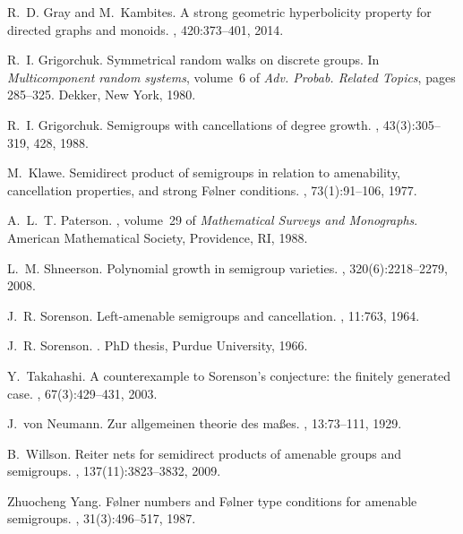 \documentclass[11pt,a4paper,reqno]{amsart}
\begin{document}
\begin{thebibliography}{10}
R.~D. Gray and M.~Kambites.
\newblock A strong geometric hyperbolicity property for directed graphs and
  monoids.
, 420:373--401, 2014.

R.~I. Grigorchuk.
\newblock Symmetrical random walks on discrete groups.
\newblock In {\em Multicomponent random systems}, volume~6 of {\em Adv. Probab.
  Related Topics}, pages 285--325. Dekker, New York, 1980.

R.~I. Grigorchuk.
\newblock Semigroups with cancellations of degree growth.
, 43(3):305--319, 428, 1988.

M.~Klawe.
\newblock Semidirect product of semigroups in relation to amenability,
  cancellation properties, and strong {F}\o lner conditions.
, 73(1):91--106, 1977.

A.~L.~T. Paterson.
, volume~29 of {\em Mathematical Surveys and
  Monographs}.
\newblock American Mathematical Society, Providence, RI, 1988.

L.~M. Shneerson.
\newblock Polynomial growth in semigroup varieties.
, 320(6):2218--2279, 2008.

J.~R. Sorenson.
\newblock Left-amenable semigroups and cancellation.
, 11:763, 1964.

J.~R. Sorenson.
.
\newblock PhD thesis, Purdue University, 1966.

Y.~Takahashi.
\newblock A counterexample to {S}orenson's conjecture: the finitely generated
  case.
, 67(3):429--431, 2003.

J.~von Neumann.
\newblock Zur allgemeinen theorie des ma{\ss}es.
, 13:73--111, 1929.

B.~Willson.
\newblock Reiter nets for semidirect products of amenable groups and
  semigroups.
, 137(11):3823--3832, 2009.

Zhuocheng Yang.
\newblock F\o lner numbers and {F}\o lner type conditions for amenable
  semigroups.
, 31(3):496--517, 1987.

\end{thebibliography}
\end{document}
